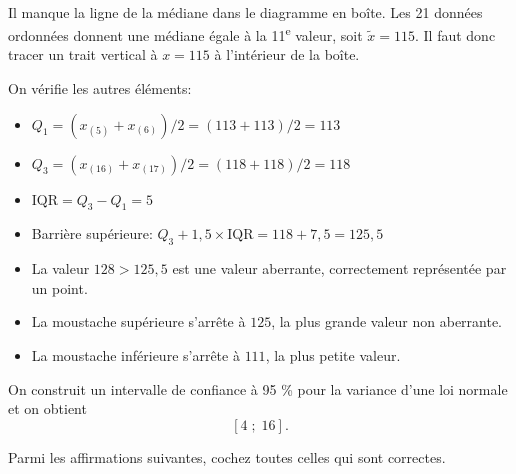 \begin{questions}
\begin{center}
\\
	\end{center}

\begin{solution}
    Il manque la ligne de la médiane dans le diagramme en boîte. Les 21 données ordonnées donnent une médiane égale à la 11\textsuperscript{e} valeur, soit $\tilde{x}=115$. Il faut donc tracer un trait vertical à $x=115$ à l'intérieur de la boîte.

    On vérifie les autres éléments:
    \begin{itemize}
        \item $Q_1 = (x_{(5)}+x_{(6)})/2=(113+113)/2=113$ \checkmark
        \item $Q_3 = (x_{(16)}+x_{(17)})/2=(118+118)/2=118$ \checkmark
        \item $\text{IQR}=Q_3 - Q_1 = 5$
        \item Barrière supérieure: $Q_3+1{,}5\times\text{IQR}=118+7{,}5=125{,}5$
        \item La valeur $128 > 125{,}5$ est une valeur aberrante, correctement représentée par un point. \checkmark
        \item La moustache supérieure s'arrête à $125$, la plus grande valeur non aberrante. \checkmark
        \item La moustache inférieure s'arrête à $111$, la plus petite valeur. \checkmark
    \end{itemize}
\end{solution}


\vspace{2.5in}

\question[3]

On construit un intervalle de confiance à 95 \% pour la variance d'une loi normale et on obtient
$$[4 \; ; \; 16].$$

Parmi les affirmations suivantes, cochez toutes celles qui sont correctes.\\


\end{questions}
